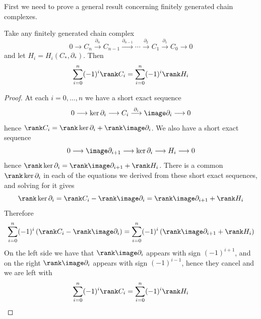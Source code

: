First we need to prove a general result concerning finitely generated chain complexes.
\begin{thm}
Take any finitely generated chain complex
\[ 0 \longrightarrow C_n \stackrel{\partial_n}{\longrightarrow} C_{n-1} \stackrel{\partial_{n-1}}{\longrightarrow} \cdots \stackrel{\partial_2}{\longrightarrow} C_1 \stackrel{\partial_1}{\longrightarrow} C_0 \longrightarrow 0 \]
and let $H_i = H_i(C_*,\partial_*)$. Then
\[ \sum_{i=0}^n (-1)^i \rank C_i = \sum_{i=0}^n (-1)^i \rank H_i \]
\end{thm}
\begin{proof}
At each $i=0,\ldots,n$ we have a short exact sequence
\[ 0 \longrightarrow \ker \partial_i \longrightarrow C_i \stackrel{\partial_i}{\longrightarrow} \image \partial_i \longrightarrow 0 \]
hence $\rank C_i = \rank \ker \partial_i + \rank \image \partial_i$. We also have a short exact sequence
\[ 0 \longrightarrow \image \partial_{i+1} \longrightarrow \ker \partial_i \longrightarrow H_i \longrightarrow 0 \]
hence $\rank \ker \partial_i = \rank \image \partial_{i+1} + \rank H_i$. There is a common $\rank \ker \partial_i$ in each of the equations we derived from these short exact sequences, and solving for it gives
\[ \rank \ker \partial_i = \rank C_i - \rank \image \partial_i = \rank \image \partial_{i+1} + \rank H_i \]
Therefore
\[ \sum_{i=0}^n (-1)^i \left( \rank C_i - \rank \image \partial_i \right) = \sum_{i=0}^n (-1)^i \left( \rank \image \partial_{i+1} + \rank H_i \right) \]
On the left side we have that $\rank \image \partial_i$ appears with sign $(-1)^{i+1}$, and on the right $\rank \image \partial_i$ appears with sign $(-1)^{i-1}$, hence they cancel and we are left with
\[ \sum_{i=0}^n (-1)^i \rank C_i = \sum_{i=0}^n (-1)^i \rank H_i \]
\end{proof}

